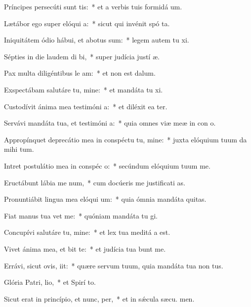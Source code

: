 \item Príncipes persecúti sunt  tis:~* et a verbis tuis formidá  um.
\item Lætábor ego super elóqui a:~* sicut qui invénit spó ta.
\item Iniquitátem ódio hábui, et abotus sum:~* legem autem tu xi.
\item Sépties in die laudem di bi,~* super judícia justí æ.
\item Pax multa diligéntibus le am:~* et non est  dalum.
\item Exspectábam salutáre tu, mine:~* et mandáta tu xi.
\item Custodívit ánima mea testimóni a:~* et diléxit ea ter.
\item Servávi mandáta tua, et testimóni a:~* quia omnes viæ meæ in con o.
\item Appropínquet deprecátio mea in conspéctu tu, mine:~* juxta elóquium tuum da mihi tum.
\item Intret postulátio mea in conspéc o:~* secúndum elóquium tuum  me.
\item Eructábunt lábia me num,~* cum docúeris me justificati as.
\item Pronuntiábit lingua mea elóqui um:~* quia ómnia mandáta  quitas.
\item Fiat manus tua  vet me:~* quóniam mandáta tu gi.
\item Concupívi salutáre tu, mine:~* et lex tua meditá a est.
\item Vivet ánima mea, et bit te:~* et judícia tua bunt me.
\item Errávi, sicut ovis,  iit:~* quære servum tuum, quia mandáta tua non  tus.
\item Glória Patri,  lio,~* et Spirí to.
\item Sicut erat in princípio, et nunc,  per,~* et in sǽcula sæcu. men.
